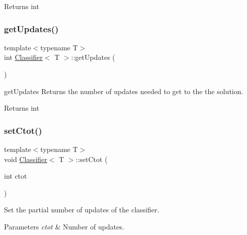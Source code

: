 \begin{DoxyReturn}{Returns}
int 
\end{DoxyReturn}
\mbox{\label{class_classifier_abde870e234b342455e113e05900f7339}} 
\subsubsection{\texorpdfstring{get\+Updates()}{getUpdates()}}
{\footnotesize\ttfamily template$<$typename T$>$ \\
int \mbox{\hyperlink{class_classifier}{Classifier}}$<$ T $>$\+::get\+Updates (\begin{DoxyParamCaption}{ }\end{DoxyParamCaption})\hspace{0.3cm}{\ttfamily [inline]}}



get\+Updates Returns the number of updates needed to get to the the solution. 

\begin{DoxyReturn}{Returns}
int 
\end{DoxyReturn}
\mbox{\label{class_classifier_a318ff28416f40269c532a80827fb30fb}} 
\subsubsection{\texorpdfstring{set\+Ctot()}{setCtot()}}
{\footnotesize\ttfamily template$<$typename T$>$ \\
void \mbox{\hyperlink{class_classifier}{Classifier}}$<$ T $>$\+::set\+Ctot (\begin{DoxyParamCaption}\item[{int}]{ctot }\end{DoxyParamCaption})\hspace{0.3cm}{\ttfamily [inline]}}



Set the partial number of updates of the classifier. 


\begin{DoxyParams}{Parameters}
{\em ctot} & Number of updates. \\
\hline
\end{DoxyParams}
\mbox{\label{class_classifier_a47b520ded0313a3cdcab8691cdd28257}} 

